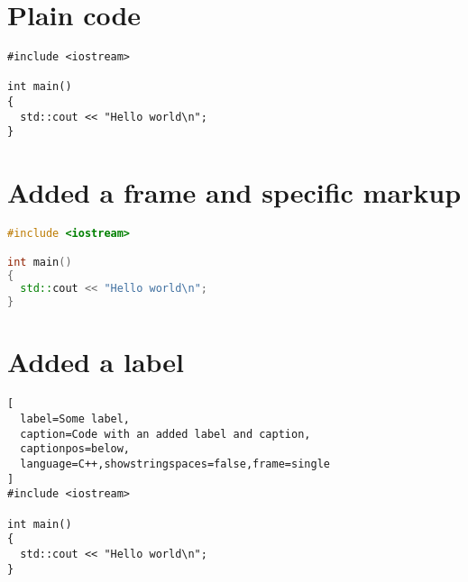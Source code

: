 \documentclass{article}
\begin{document}
\begin{abstract}

This is a \LaTeX document showing code.

\end{abstract}

\section{Plain code}

\begin{lstlisting}
#include <iostream>

int main()
{
  std::cout << "Hello world\n";
}
\end{lstlisting}

\section{Added a frame and specific markup}

\begin{lstlisting}[language=C++,showstringspaces=false,frame=single]
#include <iostream>

int main()
{
  std::cout << "Hello world\n";
}
\end{lstlisting}

\section{Added a label}

\begin{lstlisting}[
  label=Some label,
  caption=Code with an added label and caption,
  captionpos=below,
  language=C++,showstringspaces=false,frame=single
]
#include <iostream>

int main()
{
  std::cout << "Hello world\n";
}
\end{lstlisting}
\end{document}
